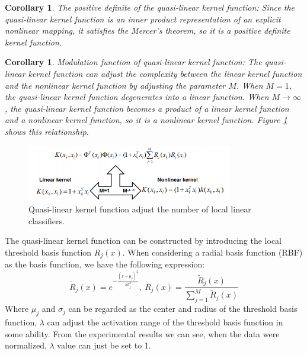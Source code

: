 \documentclass[master]{IPSstyle}
\newtheorem{corollary}[theorem]{Corollary}
\begin{document}
{\begin{corollary}
The positive definite of the quasi-linear kernel function: 
Since the quasi-linear kernel function is an inner product representation of an explicit nonlinear mapping, it satisfies the Mercer's theorem, so it is a positive definite kernel function.
\end{corollary}
\begin{corollary}
Modulation function of quasi-linear kernel function: 
The quasi-linear kernel function can adjust the complexity between the linear kernel function and the nonlinear kernel function by adjusting the parameter $M$. When $M = 1$, the quasi-linear kernel function degenerates into a linear function. When $M \to \infty$, the quasi-linear kernel function becomes a product of a linear kernel function and a nonlinear kernel function, so it is a nonlinear kernel function. Figure \ref{fg:QLSVM_M}\cite{bo2014quasi} shows this relationship.
\end{corollary}
\begin{figure}[H]
    \centering
    \includegraphics[width=0.8\textwidth]{figures/ch2_QLSVM_numberM.png}
    \caption{Quasi-linear kernel function adjust the number of local linear classifiers.}
    \label{fg:QLSVM_M}
\end{figure}

The quasi-linear kernel function can be constructed by introducing the local threshold basis function $R_j(x)$. When considering a radial basis function (RBF) as the basis function, we have the following expression:
\begin{equation} \label{eq:2.36}
\displaystyle \widetilde R_j(x) = e^{-\frac{(x-\mu_j)^2}{\lambda\sigma_j^2}}, \ 
R_j(x) = \frac{\widetilde R_j(x)}{\sum_{j=1}^{M}\widetilde R_j(x)} 
\end{equation}
Where $\mu_j$ and $\sigma_j$ can be regarded as the center and radius of the threshold basis function, $\lambda$ can adjust the activation range of the threshold basis function in some ability. From the experimental results we can see, when the data were normalized, $\lambda$ value can just be set to 1.

}
\end{document}
